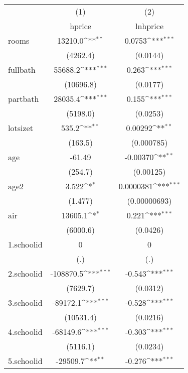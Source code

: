 {
\def\sym#1{\ifmmode^{#1}\else\(^{#1}\)\fi}
\begin{tabular}{l*{2}{c}}
\hline\hline
            &\multicolumn{1}{c}{(1)}&\multicolumn{1}{c}{(2)}\\
            &\multicolumn{1}{c}{hprice}&\multicolumn{1}{c}{lnhprice}\\
\hline
rooms       &     13210.0\sym{**} &      0.0753\sym{***}\\
            &    (4262.4)         &    (0.0144)         \\
[1em]
fullbath    &     55688.2\sym{***}&       0.263\sym{***}\\
            &   (10696.8)         &    (0.0177)         \\
[1em]
partbath    &     28035.4\sym{***}&       0.155\sym{***}\\
            &    (5198.0)         &    (0.0253)         \\
[1em]
lotsizet    &       535.2\sym{**} &     0.00292\sym{**} \\
            &     (163.5)         &  (0.000785)         \\
[1em]
age         &      -61.49         &    -0.00370\sym{**} \\
            &     (254.7)         &   (0.00125)         \\
[1em]
age2        &       3.522\sym{*}  &   0.0000381\sym{***}\\
            &     (1.477)         &(0.00000693)         \\
[1em]
air         &     13605.1\sym{*}  &       0.221\sym{***}\\
            &    (6000.6)         &    (0.0426)         \\
[1em]
1.schoolid  &           0         &           0         \\
            &         (.)         &         (.)         \\
[1em]
2.schoolid  &   -108870.5\sym{***}&      -0.543\sym{***}\\
            &    (7629.7)         &    (0.0312)         \\
[1em]
3.schoolid  &    -89172.1\sym{***}&      -0.528\sym{***}\\
            &   (10531.4)         &    (0.0216)         \\
[1em]
4.schoolid  &    -68149.6\sym{***}&      -0.303\sym{***}\\
            &    (5116.1)         &    (0.0234)         \\
[1em]
5.schoolid  &    -29509.7\sym{**} &      -0.276\sym{***}\\

\end{tabular}}
